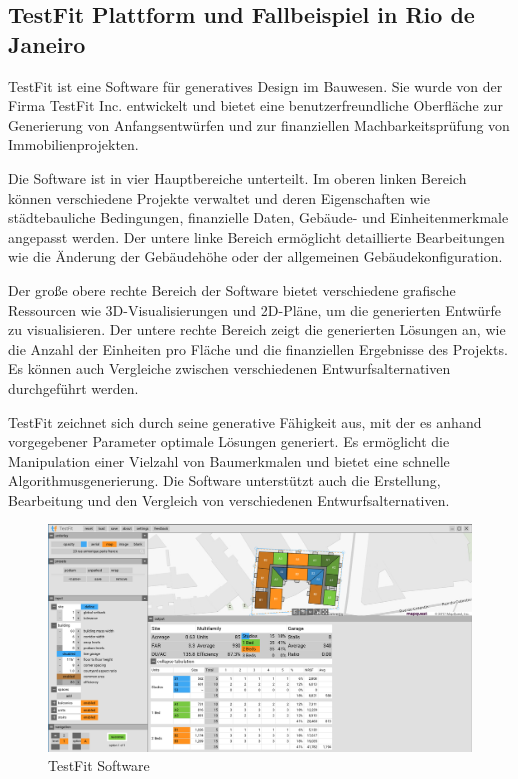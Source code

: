 \subsection*{TestFit Plattform und Fallbeispiel in  Rio de Janeiro}

TestFit ist eine Software für generatives Design im Bauwesen. Sie wurde von der Firma TestFit Inc. entwickelt und bietet eine benutzerfreundliche Oberfläche zur Generierung von Anfangsentwürfen und zur finanziellen Machbarkeitsprüfung von Immobilienprojekten.

Die Software ist in vier Hauptbereiche unterteilt. Im oberen linken Bereich können verschiedene Projekte verwaltet und deren Eigenschaften wie städtebauliche Bedingungen, finanzielle Daten, Gebäude- und Einheitenmerkmale angepasst werden. Der untere linke Bereich ermöglicht detaillierte Bearbeitungen wie die Änderung der Gebäudehöhe oder der allgemeinen Gebäudekonfiguration.

Der große obere rechte Bereich der Software bietet verschiedene grafische Ressourcen wie 3D-Visualisierungen und 2D-Pläne, um die generierten Entwürfe zu visualisieren. Der untere rechte Bereich zeigt die generierten Lösungen an, wie die Anzahl der Einheiten pro Fläche und die finanziellen Ergebnisse des Projekts. Es können auch Vergleiche zwischen verschiedenen Entwurfsalternativen durchgeführt werden.

TestFit zeichnet sich durch seine generative Fähigkeit aus, mit der es anhand vorgegebener Parameter optimale Lösungen generiert. Es ermöglicht die Manipulation einer Vielzahl von Baumerkmalen und bietet eine schnelle Algorithmusgenerierung. Die Software unterstützt auch die Erstellung, Bearbeitung und den Vergleich von verschiedenen Entwurfsalternativen.

\begin{figure}[h]
  \begin{minipage}{0.5\textwidth}
    \centering
    \includegraphics[width=\textwidth]{./images/UnitsData.jpg}
  \end{minipage}
  \caption{TestFit Software}
  \label{fig:meinbild}
\end{figure}

